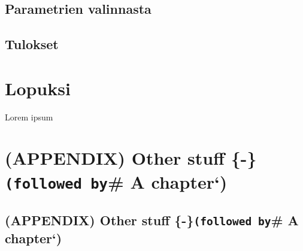 \documentclass[
  12pt,
  a4paper, twoside]{book}
\theoremstyle{definition}
\theoremstyle{definition}
\theoremstyle{definition}
\theoremstyle{definition}
\theoremstyle{remark}
\begin{document}
\hypertarget{parametrien-valinnasta}{%
\section{Parametrien valinnasta}\label{parametrien-valinnasta}}

\hypertarget{tulokset}{%
\section{Tulokset}\label{tulokset}}

\hypertarget{lopuksi}{%
\chapter{Lopuksi}\label{lopuksi}}

Lorem ipsum

\hypertarget{appendix-other-stuff--followed-by-a-chapter}{%
\chapter{\texorpdfstring{(APPENDIX) Other stuff \{-\}\texttt{(followed\ by}\# A chapter`)}{(APPENDIX) Other stuff \{-\}(followed by\# A chapter`)}}\label{appendix-other-stuff--followed-by-a-chapter}}

\hypertarget{appendix-other-stuff--followed-by-a-chapter-1}{%
\section{\texorpdfstring{(APPENDIX) Other stuff \{-\}\texttt{(followed\ by}\# A chapter`)}{(APPENDIX) Other stuff \{-\}(followed by\# A chapter`)}}\label{appendix-other-stuff--followed-by-a-chapter-1}}

  
\end{document}
